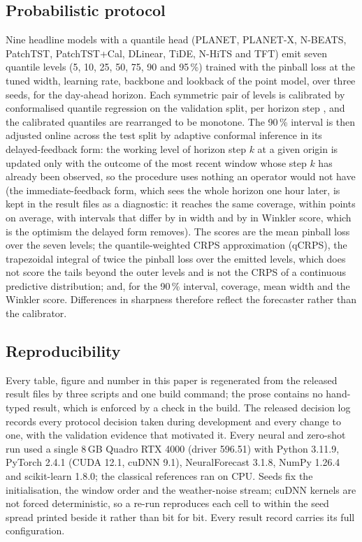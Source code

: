 \subsection{Probabilistic protocol}
\label{sec:prob}
Nine headline models with a quantile head (PLANET, PLANET-X, N-BEATS, PatchTST,
PatchTST+Cal, DLinear, TiDE, N-HiTS and TFT) emit seven quantile levels (5, 10, 25, 50, 75, 90
and 95\,\%) trained with the pinball loss at the tuned width, learning rate, backbone and
lookback of the point model, over three seeds, for the day-ahead horizon. Each symmetric pair
of levels is calibrated by conformalised quantile regression on the validation split, per
horizon step \cite{romano2019cqr}, and the calibrated quantiles are rearranged to be monotone.
The 90\,\% interval is then adjusted online across the test split by adaptive conformal
inference \cite{gibbs2021aci} in its delayed-feedback form: the working level of horizon step
$k$ at a given origin is updated only with the outcome of the most recent window whose step $k$
has already been observed, so the procedure uses nothing an operator would not have (the
immediate-feedback form, which sees the whole horizon one hour later, is kept in the result
files as a diagnostic: it reaches the same coverage, within
 points on average, with intervals that differ by
 in width and by  in
Winkler score, which is the optimism the delayed form removes). The scores are the mean pinball loss over the seven levels; the quantile-weighted
CRPS approximation (qCRPS), the trapezoidal integral of twice the pinball loss over the emitted
levels, which does not score the tails beyond the outer levels and is not the CRPS of a
continuous predictive distribution; and, for the 90\,\% interval, coverage, mean width and the
Winkler score. Differences in sharpness therefore reflect the forecaster rather than the
calibrator.

\subsection{Reproducibility}
Every table, figure and number in this paper is regenerated from the released result files by
three scripts and one build command; the prose contains no hand-typed result, which is
enforced by a check in the build. The released decision log records every protocol decision
taken during development and every change to one, with the validation evidence that motivated
it. Every neural and zero-shot run used a single 8\,GB Quadro RTX 4000 (driver 596.51) with
Python 3.11.9, PyTorch 2.4.1 (CUDA 12.1, cuDNN 9.1), NeuralForecast 3.1.8, NumPy 1.26.4 and
scikit-learn 1.8.0; the classical references ran on CPU. Seeds fix the initialisation, the
window order and the weather-noise stream; cuDNN kernels are not forced deterministic, so a
re-run reproduces each cell to within the seed spread printed beside it rather than bit for bit.
Every result record carries its full configuration.
